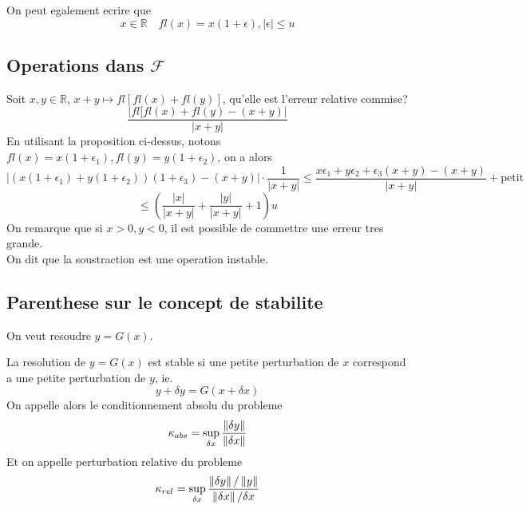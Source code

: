 \documentclass[../main.tex]{subfiles}
\begin{document}
\begin{propo}
On peut egalement ecrire que 
\[ 
x\in \mathbb{R} \quad fl( x) = x( 1+\epsilon) , |\epsilon| \leq u
\]
\end{propo}
\subsection{Operations dans $ \mathcal{F}$ }
Soit $x,y \in \mathbb{R}$, $ x+y \mapsto fl [ fl( x) + fl( y) ] $, qu'elle est l'erreur relative commise?
\[ 
	\frac{ |fl[fl( x) + fl( y)- ( x+y)  |}{|x+y|}
\]
En utilisant la proposition ci-dessus, notons $fl( x) = x( 1+\epsilon_1) , fl( y) =y( 1+\epsilon_2)$, on a alors
\[ 
	| ( x( 1+\epsilon_1) + y(1+\epsilon_2 ) ) ( 1+\epsilon_3) - ( x+y) | \cdot \frac{1}{|x+y|} \leq  \frac{x\epsilon_1+y \epsilon_2+ \epsilon_3( x+y) - ( x+y) }{|x+y|} + \mathrm{petit}
\]
\[ 
	\leq (  \frac{|x|}{|x+y|} + \frac{|y|}{|x+y|} +1) u
\]
On remarque que si $x>0, y<0$, il est possible de commettre une erreur tres grande.\\
On dit que la soustraction est une operation instable.
\subsection{Parenthese sur le concept de stabilite}
On veut resoudre $y= G( x) $.\\
\begin{defn}
	La resolution de $y=G( x) $ est stable si une petite perturbation de $x$ correspond a une petite perturbation de $y$, ie.
	\[ 
y+ \delta y = G( x+\delta x) 	
	\]
On appelle alors le conditionnement absolu du probleme
\[ 
\kappa_{abs} = \sup_{\delta x} \frac{ \left\lVert \delta y\right\rVert }{\left\lVert \delta x\right\rVert }
\]
Et on appelle perturbation relative du probleme
\[ 
\kappa_{rel} = \sup_{\delta x} \frac{ \left\lVert \delta y\right\rVert / \left\lVert y\right\rVert}{\left\lVert  \delta x \right\rVert /\delta x}
\]


\end{defn}
\end{document}
